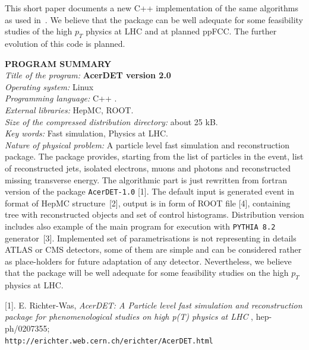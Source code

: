 \begin{titlepage}
This short paper documents a new C++ implementation of the same algorithms 
as used in~\cite{AcerDET-1.0}. We believe that the package can be well adequate 
for some feasibility studies of the high $p_T$ physics at LHC and at planned ppFCC. 
The further evolution of this code is planned.



\newpage
\boldmath
{\bf \Large PROGRAM SUMMARY}
\unboldmath
\vspace{1.0cm}
\\
{\it Title of the program:} {\bf AcerDET version 2.0}\\
{\it Operating system:} Linux\\
{\it Programming language:} C++ .\\
{\it External libraries:} HepMC, ROOT.\\
{\it Size of the compressed distribution directory:} about 25 kB.\\ 
{\it Key words:} Fast simulation, Physics at LHC.\\ 
{\it Nature of physical problem:} A particle level fast simulation and
reconstruction package. The package provides, starting
from the list of particles in the event, list of reconstructed
jets, isolated electrons, muons and photons and
reconstructed missing transverse energy. The algorithmic part is just
rewritten from fortran version of the package {\tt AcerDET-1.0} [1].
The default input is generated event in format of HepMC structure~[2],
output is in form of ROOT file [4], containing tree with reconstructed objects
and set of control histograms. 
Distribution version includes also example of the
main program for execution with {\tt PYTHIA 8.2} generator~[3].
Implemented set of parametrisations is not representing in details ATLAS or
CMS detectors, some of them are simple and can be considered
rather as place-holders for future adaptation of any detector. 
Nevertheless, we believe that the package will be well adequate for some
feasibility studies on the high $p_T$ physics at LHC.

\vspace{0.5cm}  
  
[1]. E. Richter-Was, {\it AcerDET: A Particle level fast simulation and reconstruction 
package for phenomenological studies on high p(T) physics at LHC },
hep-ph/0207355;\\ {\tt http://erichter.web.cern.ch/erichter/AcerDET.html}


\end{titlepage}
